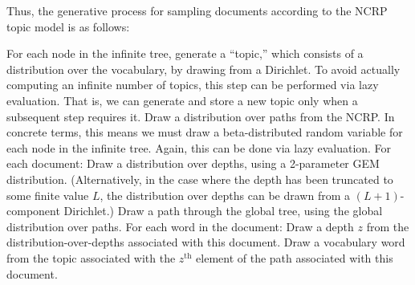 \documentclass{article}
\newcommand{\nth}{^{\text{th}}}
\begin{document}
Thus, the generative process for sampling documents according to the NCRP topic model is as follows:
\begin{outline}
\1 For each node in the infinite tree, generate a ``topic,'' which consists of a distribution over the vocabulary, by drawing from a Dirichlet.
To avoid actually computing an infinite number of topics, this step can be performed via lazy evaluation.
That is, we can generate and store a new topic only when a subsequent step requires it.
%
\1 Draw a distribution over paths from the NCRP.
In concrete terms, this means we must draw a beta-distributed random variable for each node in the infinite tree.
Again, this can be done via lazy evaluation.
%
\1 For each document:
  \2 Draw a distribution over depths, using a 2-parameter GEM distribution.  (Alternatively, in the case where the depth has been truncated to some finite value $L$, the distribution over depths can be drawn from a $(L+1)$-component Dirichlet.)
  \2 Draw a path through the global tree, using the global distribution over paths.
  \2 For each word in the document:
    \3 Draw a depth $z$ from the distribution-over-depths associated with this document.
    \3 Draw a vocabulary word from the topic associated with the $z\nth$ element of the path associated with this document.
\end{outline}

\end{document}
